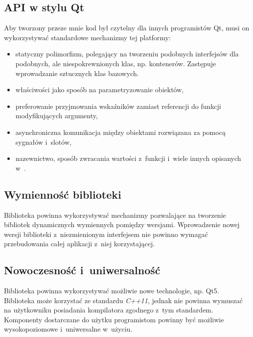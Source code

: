 \subsection{API w stylu Qt}


Aby tworzony przeze mnie kod był czytelny dla innych programistów Qt, musi on wykorzystywać standardowe mechanizmy tej platformy:
\begin{itemize}
\item{statyczny polimorfizm, polegający na tworzeniu podobnych interfejsów dla podobnych, ale niespokrewnionych klas, np. kontenerów. Zastępuje wprowadzanie sztucznych klas bazowych.}
\item{właściwości jako sposób na parametryzowanie obiektów,}
\item{preferowanie przyjmowania wskaźników zamiast referencji do funkcji modyfikujących argumenty,}
\item{asynchroniczna komunikacja między obiektami rozwiązana za pomocą sygnałów i~slotów,}
\item{nazewnictwo, sposób zwracania wartości z~funkcji i~wiele innych opisanych w~\cite{APIDesign}.}
\end{itemize}

\subsection{Wymienność biblioteki}
Biblioteka powinna wykorzystywać mechanizmy pozwalające na tworzenie bibliotek dynamicznych wymiennych pomiędzy wersjami. Wprowadzenie nowej wersji biblioteki z~niezmienionym interfejsem nie powinno wymagać przebudowania całej aplikacji z~niej korzystającej.

\subsection{Nowoczesność i~uniwersalność}
Biblioteka powinna wykorzystywać możliwie nowe technologie, np. Qt5. Biblioteka może korzystać ze standardu \textit{C++11}, jednak nie powinna wymuszać na użytkowniku posiadania kompilatora zgodnego z~tym standardem. Komponenty dostarczane do użytku programistom powinny być możliwie wysokopoziomowe i~uniwersalne w~użyciu.

